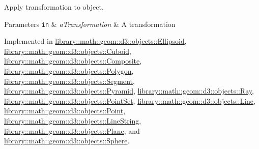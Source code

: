 Apply transformation to object. 


\begin{DoxyParams}[1]{Parameters}
\mbox{\tt in}  & {\em a\+Transformation} & A transformation \\
\hline
\end{DoxyParams}


Implemented in \hyperlink{classlibrary_1_1math_1_1geom_1_1d3_1_1objects_1_1_ellipsoid_a101408b676b518c0270ebabc55f288d2}{library\+::math\+::geom\+::d3\+::objects\+::\+Ellipsoid}, \hyperlink{classlibrary_1_1math_1_1geom_1_1d3_1_1objects_1_1_cuboid_a97a3057434b7c90891a5bdb1cd4b907c}{library\+::math\+::geom\+::d3\+::objects\+::\+Cuboid}, \hyperlink{classlibrary_1_1math_1_1geom_1_1d3_1_1objects_1_1_composite_a607850ccaeaea1dcd0cc57f986bea243}{library\+::math\+::geom\+::d3\+::objects\+::\+Composite}, \hyperlink{classlibrary_1_1math_1_1geom_1_1d3_1_1objects_1_1_polygon_a712a6f0b739c0f92f3c64873482da217}{library\+::math\+::geom\+::d3\+::objects\+::\+Polygon}, \hyperlink{classlibrary_1_1math_1_1geom_1_1d3_1_1objects_1_1_segment_a63c7017391bcc0e67f4d97311e7ebdb2}{library\+::math\+::geom\+::d3\+::objects\+::\+Segment}, \hyperlink{classlibrary_1_1math_1_1geom_1_1d3_1_1objects_1_1_pyramid_a79d9b11e42c47213e2eb9538e52a2103}{library\+::math\+::geom\+::d3\+::objects\+::\+Pyramid}, \hyperlink{classlibrary_1_1math_1_1geom_1_1d3_1_1objects_1_1_ray_a0dd177a924978e1817a9fa888594e694}{library\+::math\+::geom\+::d3\+::objects\+::\+Ray}, \hyperlink{classlibrary_1_1math_1_1geom_1_1d3_1_1objects_1_1_point_set_aa747a6169cd9c14011c8249a728c3c48}{library\+::math\+::geom\+::d3\+::objects\+::\+Point\+Set}, \hyperlink{classlibrary_1_1math_1_1geom_1_1d3_1_1objects_1_1_line_ae485ab541cbd10113eac30d1956fb4c0}{library\+::math\+::geom\+::d3\+::objects\+::\+Line}, \hyperlink{classlibrary_1_1math_1_1geom_1_1d3_1_1objects_1_1_point_ad2052f6ef5df88b75cae09c58a678f95}{library\+::math\+::geom\+::d3\+::objects\+::\+Point}, \hyperlink{classlibrary_1_1math_1_1geom_1_1d3_1_1objects_1_1_line_string_a8a20f45b2af9cc45dbf7aff9e5d4824e}{library\+::math\+::geom\+::d3\+::objects\+::\+Line\+String}, \hyperlink{classlibrary_1_1math_1_1geom_1_1d3_1_1objects_1_1_plane_ab3474aef2e9f8dd4f9e86da017522487}{library\+::math\+::geom\+::d3\+::objects\+::\+Plane}, and \hyperlink{classlibrary_1_1math_1_1geom_1_1d3_1_1objects_1_1_sphere_acb4ca3f037791f9f71bffc904a1bf961}{library\+::math\+::geom\+::d3\+::objects\+::\+Sphere}.

\mbox{\label{classlibrary_1_1math_1_1geom_1_1d3_1_1_object_a0428ee9010710f5ec7d055a86cc586f8}} 
